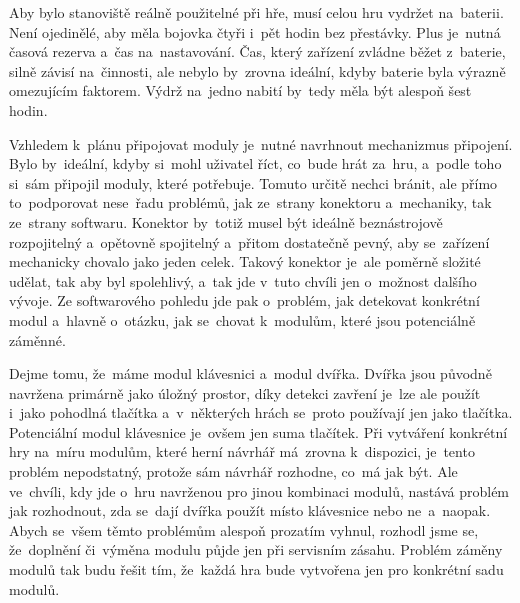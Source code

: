 Aby bylo stanoviště reálně použitelné při hře, musí celou hru vydržet na~baterii.
Není ojedinělé, aby měla bojovka čtyři i~pět hodin bez přestávky.
Plus je~nutná časová rezerva a~čas na~nastavování.
Čas, který zařízení zvládne běžet z~baterie, silně závisí na~činnosti, ale nebylo by~zrovna ideální, kdyby baterie byla výrazně omezujícím faktorem.
Výdrž na~jedno nabití by~tedy měla být alespoň šest hodin.

Vzhledem k~plánu připojovat moduly je~nutné navrhnout mechanizmus připojení.
Bylo by~ideální, kdyby si~mohl uživatel říct, co~bude hrát za~hru, a~podle toho si~sám připojil moduly, které potřebuje.
Tomuto určitě nechci bránit, ale přímo to~podporovat nese~řadu problémů, jak ze~strany konektoru a~mechaniky, tak ze~strany softwaru.
Konektor by~totiž musel být ideálně beznástrojově rozpojitelný a~opětovně spojitelný a~přitom dostatečně pevný, aby se~zařízení mechanicky chovalo jako jeden celek.
Takový konektor je~ale poměrně složité udělat, tak aby byl spolehlivý, a~tak jde v~tuto chvíli jen o~možnost dalšího vývoje.
Ze softwarového pohledu jde pak o~problém, jak detekovat konkrétní modul a~hlavně o~otázku, jak se~chovat k~modulům, které jsou potenciálně záměnné.

Dejme tomu, že~máme modul klávesnici a~modul dvířka.
Dvířka jsou původně navržena primárně jako úložný prostor, díky detekci zavření je~lze ale použít i~jako pohodlná tlačítka a~v~některých hrách se~proto používají jen jako tlačítka.
Potenciální modul klávesnice je~ovšem jen suma tlačítek.
Při vytváření konkrétní hry na~míru modulům, které herní návrhář má~zrovna k~dispozici, je~tento problém nepodstatný, protože sám návrhář rozhodne, co~má jak být.
Ale ve~chvíli, kdy jde o~hru navrženou pro jinou kombinaci modulů, nastává problém jak rozhodnout, zda se~dají dvířka použít místo klávesnice nebo ne~a~naopak.
Abych se~všem těmto problémům alespoň prozatím vyhnul, rozhodl jsme se, že~doplnění či~výměna modulu půjde jen při servisním zásahu.
Problém záměny modulů tak budu řešit tím, že~každá hra bude vytvořena jen pro konkrétní sadu modulů.


